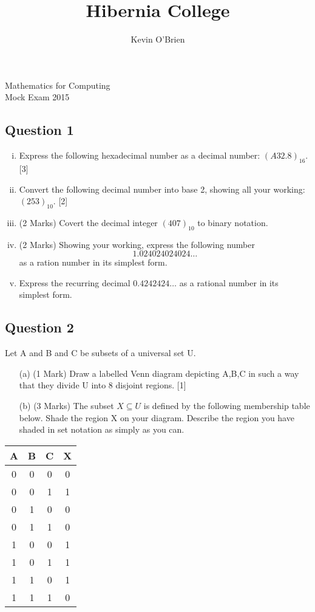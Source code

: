 \documentclass[12pt]{article} %
\title{Hibernia College}
\author{Kevin O'Brien}
\begin{document}
\begin{center}
\huge{Mathematics for Computing}\\
\LARGE{Mock Exam 2015}
\end{center}

\subsection*{Question 1}

\begin{enumerate}[(i)]
	\item Express the following hexadecimal number as a decimal number: $(A32.8)_16$.
	[3]
	\item Convert the following decimal number into base 2, showing all your working:
	$(253)_{10}$. [2]
		\item (2 Marks) Covert the decimal integer $(407)_{10}$ to binary notation.
		
		\item (2 Marks) Showing your working, express the following number 
		\[ 1.024024024024\ldots\]
		as a ration number in its simplest form.
	\item Express the recurring decimal $0.4242424\ldots$
	as a rational number in its simplest
	form. 
\end{enumerate}
\subsection*{Question 2}
Let A and B and C be subsets of a universal set U.
\begin{itemize}
\item[(a)] (1 Mark) Draw a labelled Venn diagram depicting A,B,C in such a way that they divide
U into 8 disjoint regions. [1]
\item[(b)] (3 Marks) The subset $X \subseteq U$ is defined by the following membership table below. Shade the region X on your diagram. Describe the region you have shaded in
set notation as simply as you can. 
\end{itemize}
\begin{center}
\begin{tabular}{|c|c|c|c|}
	\hline
	A & B & C & X \\ \hline
	0 & 0 & 0 & 0 \\ \hline
	0 & 0 & 1 & 1 \\ \hline
	0 & 1 & 0 & 0 \\ \hline
	0 & 1 & 1 & 0 \\ \hline
	1 & 0 & 0 & 1 \\ \hline
	1 & 0 & 1 & 1 \\ \hline
	1 & 1 & 0 & 1 \\ \hline
	1 & 1 & 1 & 0 \\ \hline
\end{tabular} 
\end{center}
\end{document}
